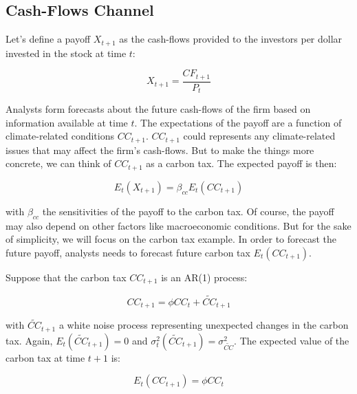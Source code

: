 \subsection{Cash-Flows Channel}

Let's define a payoff $X_{t+1}$ as the 
cash-flows provided to the investors per dollar invested in the stock at time $t$:

\begin{equation}
    X_{t+1} = \frac{CF_{t+1}}{P_t}
\end{equation}

Analysts form forecasts 
about the future cash-flows of the firm
based on information available at time $t$.
The expectations of the payoff
are a function of climate-related
conditions $CC_{t+1}$. $CC_{t+1}$ could represents 
any climate-related issues that may affect the
firm's cash-flows. But to make the things more 
concrete, we can think of $CC_{t+1}$ as 
a carbon tax. 
The expected payoff is then:

\begin{equation}
    E_t(X_{t+1}) = \beta_{cc} E_t(CC_{t+1})
\end{equation}

with $\beta_{cc}$ the sensitivities of 
the payoff to the carbon tax. Of course,
the payoff may also depend on other factors
like macroeconomic conditions. But 
for the sake of simplicity, we will focus
on the carbon tax example.
In order to forecast the future payoff, analysts 
needs to forecast future carbon tax
$E_t(CC_{t+1})$.

Suppose that the carbon tax $CC_{t+1}$ is an AR(1) process:

\begin{equation}
    CC_{t+1} = \phi CC_t + \tilde{CC}_{t+1}
\end{equation}

with $\tilde{CC}_{t+1}$ a white noise process
representing unexpected changes in the carbon tax.
Again, $E_t(\tilde{CC}_{t+1}) = 0$ and
$\sigma_t^2(\tilde{CC}_{t+1}) = \sigma_{\tilde{CC}}^2$.
The expected value of the carbon tax at time $t+1$ is:

\begin{equation}
    E_t(CC_{t+1}) = \phi CC_t
\end{equation}


